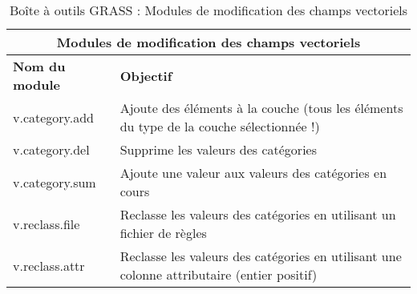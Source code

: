 \begin{table}[H]
\centering
 \begin{tabular}{|p{4cm}|p{10cm}|}
  \hline \multicolumn{2}{|c|}{\textbf{Modules de modification des champs vectoriels}}\\
  \hline \textbf{Nom du module} & \textbf{Objectif} \\
  \hline v.category.add & Ajoute des éléments à la couche (tous les éléments du type de la couche sélectionnée !)\\
  \hline v.category.del & Supprime les valeurs des catégories\\
  \hline v.category.sum & Ajoute une valeur aux valeurs des catégories en cours\\
  \hline v.reclass.file & Reclasse les valeurs des catégories en utilisant un fichier de règles\\
  \hline v.reclass.attr & Reclasse les valeurs des catégories en utilisant une colonne attributaire (entier positif)\\
\hline
\end{tabular}
\caption{Boîte à outils GRASS : Modules de modification des champs vectoriels}
\end{table}

